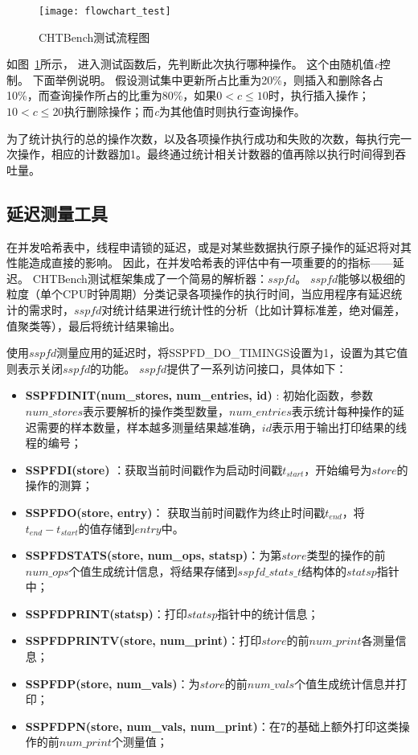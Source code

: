 \begin{figure}[htbp]
\centering
\texttt{[image: flowchart\_test]}
\caption{CHTBench测试流程图}\label{fig:flowchart}
\end{figure}

如图~\ref{fig:flowchart}所示，
进入测试函数后，先判断此次执行哪种操作。
这个由随机值\textit{c}控制。
下面举例说明。
假设测试集中更新所占比重为20\%，则插入和删除各占10\%，而查询操作所占的比重为80\%，如果$0 < c \leq 10$时，执行插入操作；$10 < c \leq 20$执行删除操作；而\textit{c}为其他值时则执行查询操作。

为了统计执行的总的操作次数，以及各项操作执行成功和失败的次数，每执行完一次操作，相应的计数器加1。最终通过统计相关计数器的值再除以执行时间得到吞吐量。

\subsection{延迟测量工具}
在并发哈希表中，线程申请锁的延迟，或是对某些数据执行原子操作的延迟将对其性能造成直接的影响。
因此，在并发哈希表的评估中有一项重要的的指标——延迟。
CHTBench测试框架集成了一个简易的解析器：$sspfd$。
$sspfd$能够以极细的粒度（单个CPU时钟周期）分类记录各项操作的执行时间，当应用程序有延迟统计的需求时，$sspfd$对统计结果进行统计性的分析（比如计算标准差，绝对偏差，值聚类等），最后将统计结果输出。

使用$sspfd$测量应用的延迟时，将SSPFD\_DO\_TIMINGS设置为1，设置为其它值则表示关闭$sspfd$的功能。
$sspfd$提供了一系列访问接口，具体如下：
\begin{itemize}
\item[1.] \textbf{SSPFDINIT(num\_stores, num\_entries, id)} : 初始化函数，参数$num\_stores$表示要解析的操作类型数量，$num\_entries$表示统计每种操作的延迟需要的样本数量，样本越多测量结果越准确，$id$表示用于输出打印结果的线程的编号；
\item[2.] \textbf{SSPFDI(store)} ：获取当前时间戳作为启动时间戳$t_{start}$，开始编号为$store$的操作的测算；
\item[3.] \textbf{SSPFDO(store, entry)}： 获取当前时间戳作为终止时间戳$t_{end}$，将$t_{end} - t_{start}$的值存储到$entry$中。
\item[4.] \textbf{SSPFDSTATS(store, num\_ops, statsp)}：为第$store$类型的操作的前$num\_ops$个值生成统计信息，将结果存储到$sspfd\_stats\_t$结构体的$statsp$指针中；
\item[5.] \textbf{SSPFDPRINT(statsp)}：打印$statsp$指针中的统计信息；
\item[6.] \textbf{SSPFDPRINTV(store, num\_print)}：打印$store$的前$num\_print$各测量信息；
\item[7.] \textbf{SSPFDP(store, num\_vals)}：为$store$的前$num\_vals$个值生成统计信息并打印；
\item[8.] \textbf{SSPFDPN(store, num\_vals, num\_print)}：在7的基础上额外打印这类操作的前$num\_print$个测量值；
\end{itemize}
